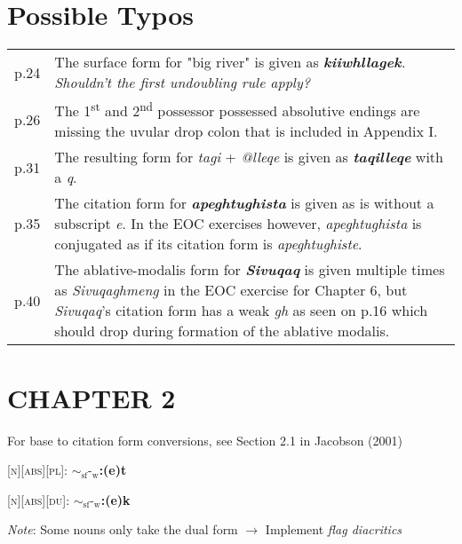 \documentclass{article}
\begin{document}
\section{Possible Typos}

\begin{tabular}{p{1cm}p{10.5cm}}
p.24 & The surface form for "big river" is given as \textit{\textbf{kiiwhllagek}. Shouldn't the first undoubling rule apply?} \\

p.26 & The 1\textsuperscript{st} and 2\textsuperscript{nd} possessor possessed absolutive endings are missing the uvular drop colon that is included in Appendix I. \\

p.31 & The resulting form for \textit{tagi} + \textit{@lleqe} is given as \textit{\textbf{taqilleqe}} with a \textit{q}. \\

p.35 & The citation form for \textit{\textbf{apeghtughista}} is given as is without a subscript \textit{e}. In the EOC exercises however, \textit{apeghtughista} is conjugated as if its citation form is \textit{apeghtughiste}. \\

p.40 & The ablative-modalis form for \textit{\textbf{Sivuqaq}} is given multiple times as \textit{Sivuqaghmeng} in the EOC exercise for Chapter 6, but \textit{Sivuqaq}'s citation form has a weak \textit{gh} as seen on p.16 which should drop during formation of the ablative modalis.\\

\end{tabular}

\section*{CHAPTER 2}
For base to citation form conversions, see Section 2.1 in Jacobson (2001)

\bigskip

\textsc{[n][abs][pl]}: \textbf{${\sim}_\text{sf}\text{-}_\text{w}$:(e)t}

\noindent \textsc{[n][abs][du]}: \textbf{${\sim}_\text{sf}\text{-}_\text{w}$:(e)k}

\bigskip

\textit{Note}: Some nouns only take the dual form $\rightarrow$ Implement \textit{flag diacritics}
\end{document}
